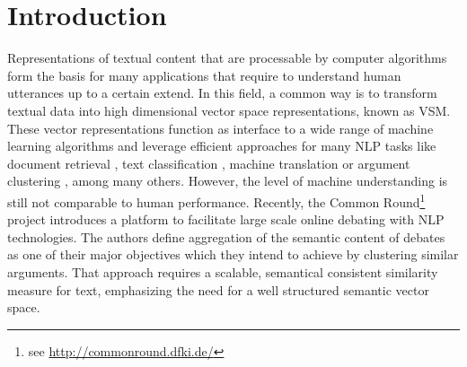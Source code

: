 \section{Introduction} %

Representations of textual content that are processable by computer algorithms form the basis for many applications that require to understand human utterances up to a certain extend. In this field, a common way is to transform textual data into high dimensional vector space representations, known as \ac{VSM}\autocite{salton_vector_1975}. These vector representations function as interface to a wide range of machine learning algorithms and leverage efficient approaches for many \ac{NLP} tasks like document retrieval \autocite{manning_introduction_2008}, text classification \autocite{sahami_bayesian_1998}, machine translation \autocite{wu_googles_2016} or argument clustering \autocite{boltuzic_identifying_2015}, among many others. However, the level of machine understanding is still not comparable to human performance. Recently, the Common Round\footnote{see \url{http://commonround.dfki.de/}} project \autocite{uszkoreit_common_2017} introduces a platform to facilitate large scale online debating with \ac{NLP} technologies. The authors define aggregation of the semantic content of debates as one of their major objectives which they intend to achieve by clustering similar arguments. That approach requires a scalable, semantical consistent similarity measure for text, emphasizing the need for a well structured semantic vector space. 


